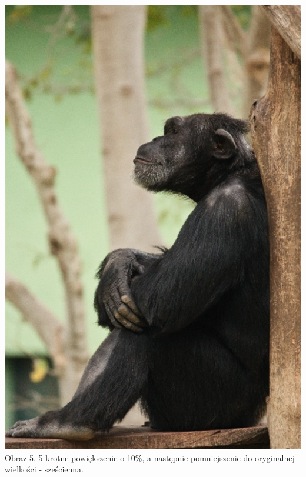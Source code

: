 \documentclass[14pt]{article}
\begin{document}
\begin{center}
    \includegraphics[scale=0.3]{images/5x_BACK_TO_ORG_bc.jpg}
    \\ \small Obraz 5. 5-krotne powiększenie o 10\%, a następnie pomniejszenie
    do oryginalnej wielkości - sześcienna.


\end{center}
\end{document}
